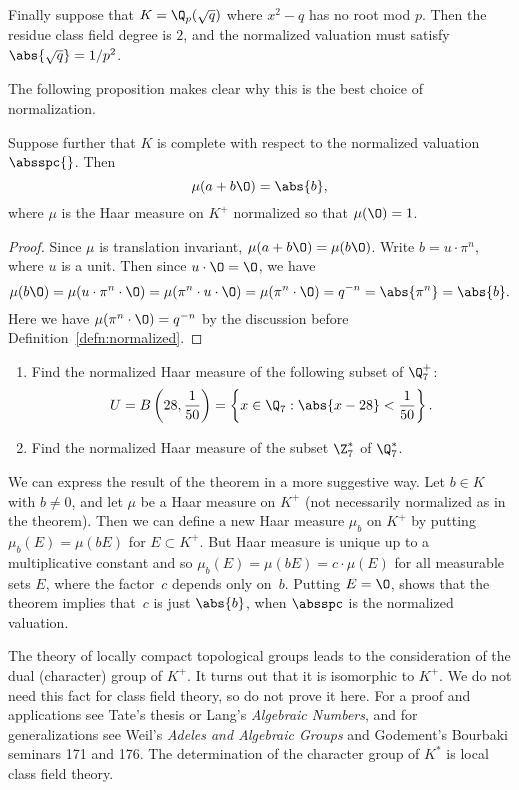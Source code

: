 \documentclass[11pt]{book}
\begin{document}
\begin{ch}
\begin{example}
Finally suppose that $K=\Q_p(\sqrt{q})$ where $x^2-q$
has no root mod $p$.  Then the residue class field
degree is $2$, and the normalized valuation must
satisfy $\abs{\sqrt{q}} = 1/p^2$.
\end{example}


The following proposition makes clear why this is the best choice of
normalization.
\begin{theorem}
Suppose further that $K$ is complete with respect to the normalized
valuation $\absspc{}$.  Then
$$
\mu(a + b\O) = \abs{b},
$$
where $\mu$ is the Haar measure on $K^+$ normalized so
that $\mu(\O)=1$.
\end{theorem}
\begin{proof}
Since $\mu$ is translation invariant, $\mu(a+b\O) = \mu(b\O)$.
Write $b=u\cdot \pi^n$, where $u$ is a unit. Then since $u\cdot
\O=\O$, we have
$$\mu(b\O)
  = \mu(u\cdot \pi^n\cdot \O) = \mu(\pi^n \cdot u\cdot\O)
    = \mu(\pi^n\cdot \O) = q^{-n} = \abs{\pi^n} = \abs{b}.
$$
Here we have $\mu(\pi^n\cdot \O) = q^{-n}$ by the discussion
before Definition~\ref{defn:normalized}.
\end{proof}

\begin{exercise}\label{ex:adics1}
\begin{enumerate}
\item Find the normalized Haar measure of the following subset of
$\Q_7^+$:
$$
U = B\left(28,\frac{1}{50}\right) =
\left\lbrace x\in \Q_7 : \abs{x-28} < \frac{1}{50}\right\rbrace.
$$
\item
Find the normalized Haar measure of the subset $\Z_7^*$ of
$\Q_7^*$.
\end{enumerate}
\end{exercise}

We can express the result of the theorem in a more suggestive way.
Let $b\in K$ with $b\neq 0$, and let $\mu$ be a Haar measure on $K^+$
(not necessarily normalized as in the theorem).  Then we can define a
new Haar measure $\mu_b$ on $K^+$ by putting $\mu_b(E) = \mu(bE)$ for
$E\subset K^+$.  But Haar measure is unique up to a multiplicative
constant and so $\mu_b(E) = \mu(bE) = c\cdot \mu(E)$ for all
measurable sets $E$, where the factor~$c$ depends only on~$b$.
Putting $E=\O$, shows that the theorem implies that~$c$ is just
$\abs{b}$, when $\absspc$ is the normalized valuation.

\begin{remark}
  The theory of locally compact topological groups leads to the
  consideration of the dual (character) group of $K^+$.  It turns out
  that it is isomorphic to $K^+$.  We do not need this fact for class
  field theory, so do not prove it here.  For a proof and applications
  see Tate's thesis or Lang's {\em Algebraic Numbers}, and for
  generalizations see Weil's {\em Adeles and Algebraic Groups} and
  Godement's Bourbaki seminars 171 and 176.  The determination of the
  character group of $K^*$ is local class field theory.
\end{remark}


\end{ch}
\end{document}
